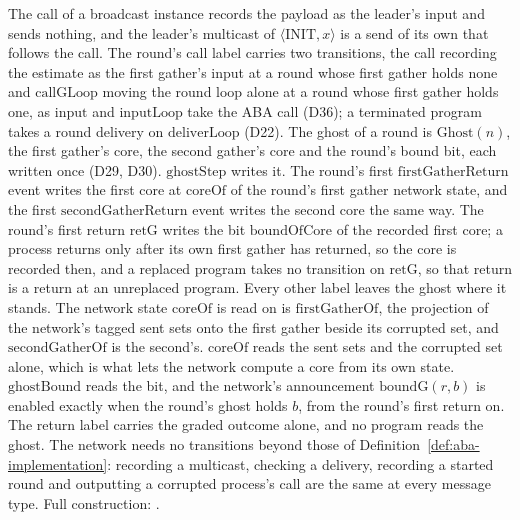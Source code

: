 \begin{definition}
  The call of a broadcast instance records the payload as the leader's input and sends nothing, and the leader's multicast of $\langle\mathrm{INIT}, x\rangle$ is a send of its own that follows the call.
  The round's call label carries two transitions, the call recording the estimate as the first gather's input at a round whose first gather holds none and $\mathrm{callGLoop}$ moving the round loop alone at a round whose first gather holds one, as $\mathrm{input}$ and $\mathrm{inputLoop}$ take the ABA call (D36); a terminated program takes a round delivery on $\mathrm{deliverLoop}$ (D22).
  The ghost of a round is $\mathrm{Ghost}(n)$, the first gather's core, the second gather's core and the round's bound bit, each written once (D29, D30).
  $\mathrm{ghostStep}$ writes it.
  The round's first $\mathrm{firstGatherReturn}$ event writes the first core at $\mathrm{coreOf}$ of the round's first gather network state, and the first $\mathrm{secondGatherReturn}$ event writes the second core the same way.
  The round's first return $\mathrm{retG}$ writes the bit $\mathrm{boundOfCore}$ of the recorded first core; a process returns only after its own first gather has returned, so the core is recorded then, and a replaced program takes no transition on $\mathrm{retG}$, so that return is a return at an unreplaced program.
  Every other label leaves the ghost where it stands.
  The network state $\mathrm{coreOf}$ is read on is $\mathrm{firstGatherOf}$, the projection of the network's tagged sent sets onto the first gather beside its corrupted set, and $\mathrm{secondGatherOf}$ is the second's.
  $\mathrm{coreOf}$ reads the sent sets and the corrupted set alone, which is what lets the network compute a core from its own state.
  $\mathrm{ghostBound}$ reads the bit, and the network's announcement $\mathrm{boundG}(r,b)$ is enabled exactly when the round's ghost holds $b$, from the round's first return on.
  The return label carries the graded outcome alone, and no program reads the ghost.
  The network needs no transitions beyond those of Definition~\ref{def:aba-implementation}: recording a multicast, checking a delivery, recording a started round and outputting a corrupted process's call are the same at every message type.
  Full construction: .
\end{definition}
